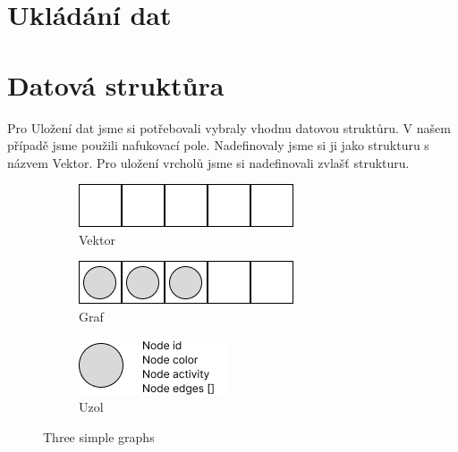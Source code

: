 \section{Ukládání dat}

\section{Datová struktůra}

Pro Uložení dat jsme si potřebovali vybraly vhodnu datovou struktůru. V našem případě jsme použili nafukovací pole.
Nadefinovaly jsme si ji jako strukturu s názvem Vektor. Pro uložení vrcholů jsme si nadefinovali zvlašť strukturu.

\begin{figure}[h]
    \centering
    \begin{subfigure}[b]{0.3\textwidth}
        \centering
        \includegraphics[width=\textwidth]{doc/fig/vector.png}
        \caption{Vektor}
        \label{fig:vector}
    \end{subfigure}
    \hfill
    \begin{subfigure}[b]{0.3\textwidth}
        \centering
        \includegraphics[width=\textwidth]{doc/fig/graph.png}
        \caption{Graf}
        \label{fig:graph}
    \end{subfigure}
    \hfill
    \begin{subfigure}[b]{0.3\textwidth}
        \centering
        \includegraphics[width=\textwidth]{doc/fig/node.png}
        \caption{Uzol}
        \label{fig:five over x}
    \end{subfigure}
    \caption{Three simple graphs}
    \label{fig:three graphs}
\end{figure}


